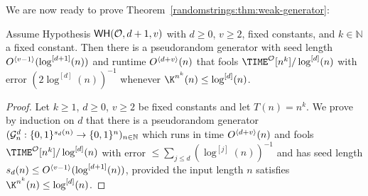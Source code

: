 We are now ready to prove Theorem~\ref{randomstrings:thm:weak-generator}:
\begin{theorem*}
Assume Hypothesis $\mathsf{WH}(\mathcal{O},d+1,v)$ with $d \geq 0$, $v \geq 2$, fixed constants, and $k \in \mathbb{N}$ a fixed constant. Then there is a pseudorandom generator with seed length $O^{\langle v -1  \rangle}(\log^{[d+1]}(n))$ and runtime $O^{\langle d+v \rangle}(n)$ that fools $\TIME^\mathcal{O}[n^k]/\log^{[d]}(n)$ with error $(2 \log^{[d]}(n))^{-1}$ whenever $\K^{n^k}(n) \leq \log^{[d]}(n)$.
\end{theorem*}
\begin{proof}
Let $k\geq 1$, $d \geq 0$, $v \geq 2$ be fixed constants and let $T(n) = n^k$.
We prove by induction on $d$ that there is a pseudorandom generator $(\mathcal{G}^d_n: \{0,1\}^{s_d(n)} \to \{0,1\}^n)_{n \in \mathbb{N}}$ which runs in time $O^{\langle d + v \rangle}(n)$ and fools $\TIME^\mathcal{O}[n^k]/\log^{[d]}(n)$ with error $\leq \sum_{j \leq d} (\log^{[j]}(n))^{-1}$ and has seed length $s_d(n) \leq O^{\langle v -1  \rangle}(\log^{[d+1]}(n))$, provided the input length $n$ satisfies $\K^{n^k}(n) \leq \log^{[d]}(n)$.


\end{proof}
